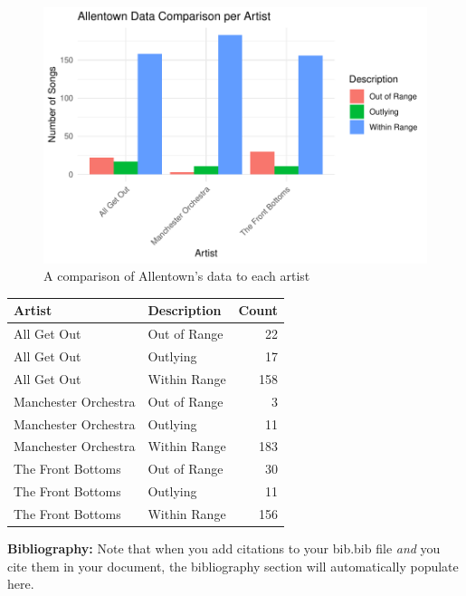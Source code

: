 \documentclass{article}\usepackage[]{graphicx}\usepackage[]{xcolor}
\begin{document}
\begin{multicols}{2}
\begin{figure}[H]
 \begin{center}
 \includegraphics[scale=0.65]{descript_plot.pdf}
 \caption{A comparison of Allentown's data to each artist}
 \label{plot3}
 \end{center}
 \end{figure}






\begin{table}[H]
\centering
\begingroup\small
\begin{tabular}{llr}
  \hline
Artist & Description & Count \\ 
  \hline
All Get Out & Out of Range &  22 \\ 
  All Get Out & Outlying &  17 \\ 
  All Get Out & Within Range & 158 \\ 
  Manchester Orchestra & Out of Range &   3 \\ 
  Manchester Orchestra & Outlying &  11 \\ 
  Manchester Orchestra & Within Range & 183 \\ 
  The Front Bottoms & Out of Range &  30 \\ 
  The Front Bottoms & Outlying &  11 \\ 
  The Front Bottoms & Within Range & 156 \\ 
   \hline
\end{tabular}
\endgroup
\label{count.tab}
\end{table}






\vspace{2em}

\noindent\textbf{Bibliography:} Note that when you add citations to your bib.bib file \emph{and}
you cite them in your document, the bibliography section will automatically populate here.

\begin{tiny}

\end{tiny}
\end{multicols}

\end{document}
